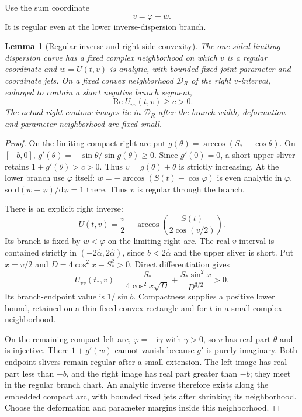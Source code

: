 \documentclass[11pt]{article}
\numberwithin{equation}{section}
\newtheorem{lemma}[theorem]{Lemma}
\theoremstyle{remark}\newtheorem{remark}[theorem]{Remark}
\newcommand{\ii}{\mathrm i}
\newcommand{\dd}{\mathrm d}
\newcommand{\Rea}{\operatorname{Re}}
\begin{document}
Use the sum coordinate
\[
 v=\varphi+w.
\]
It is regular even at the lower inverse-dispersion branch.

\begin{lemma}[Regular inverse and right-side convexity]\label{lem:inverse}
The one-sided limiting dispersion curve has a fixed complex
neighborhood on which $v$ is a regular coordinate and $w=U(t,v)$
is analytic, with bounded fixed joint parameter and coordinate jets.
On a fixed convex neighborhood $\mathcal D_R$ of the right
$v$-interval, enlarged to contain a short negative branch segment,
\[
 \Rea U_{vv}(t,v)\ge c>0.
\]
The actual right-contour images lie in $\mathcal D_R$ after the
branch width, deformation and parameter neighborhood are fixed small.
\end{lemma}
\begin{proof}
On the limiting compact right arc put
$g(\theta)=\arccos(S_*-\cos\theta)$.
On $[-b,0]$,
$g'(\theta)=-\sin\theta/\sin g(\theta)\ge0$.
Since $g'(0)=0$, a short upper sliver retains
$1+g'(\theta)>c>0$. Thus $v=g(\theta)+\theta$ is strictly increasing.
At the lower branch use $\varphi$ itself:
$w=-\arccos(S(t)-\cos\varphi)$ is even analytic in $\varphi$,
so $\dd(w+\varphi)/\dd\varphi=1$ there. Thus $v$ is regular
through the branch.

There is an explicit right inverse:
\begin{equation}\label{eq:v-1}
 U(t,v)=\frac v2-
       \arccos\left(\frac{S(t)}{2\cos(v/2)}\right).
\end{equation}
Its branch is fixed by $w<\varphi$ on the limiting right arc.
The real $v$-interval is contained strictly in
$(-2\widehat\alpha,2\widehat\alpha)$, since $b<2\widehat\alpha$
and the upper sliver is short. Put $x=v/2$ and
$D=4\cos^2x-S_*^2>0$. Direct differentiation gives
\begin{equation}\label{eq:v-2}
 U_{vv}(t_*,v)=\frac{S_*}{4\cos^2x\sqrt D}
                  +\frac{S_*\sin^2x}{D^{3/2}}>0.
\end{equation}
Its branch-endpoint value is $1/\sin b$.
Compactness supplies a positive lower bound, retained on a thin
fixed convex rectangle and for $t$ in a small complex neighborhood.

On the remaining compact left arc, $\varphi=-\ii\gamma$ with
$\gamma>0$, so $v$ has real part $\theta$ and is injective.
There $1+g'(w)$ cannot vanish because $g'$ is purely imaginary.
Both endpoint slivers remain regular after a small extension.
The left image has real part less than $-b$, and the right image
has real part greater than $-b$; they meet in the regular branch
chart. An analytic inverse therefore exists along the embedded
compact arc, with bounded fixed jets after shrinking its neighborhood.
Choose the deformation and parameter margins inside this neighborhood.
\end{proof}
\end{document}
